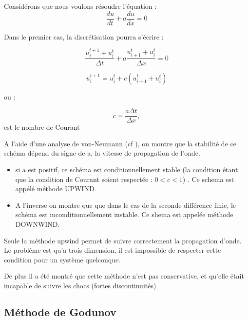 Considérons que nous voulons résoudre l'équation :
\begin{equation}
\frac{du}{dt} + a\frac{du}{dx} = 0
\end{equation}

Dans le premier cas, la discrétisation pourra s'écrire : 


\begin{equation}
\frac{u_i^{t+1} + u_i^t }{\Delta t}   +a \frac{u_{i+1}^t  + u_i^t}{\Delta x} = 0
\end{equation}


\begin{equation}
u_i^{t+1}  = u_i^t +  c \left( u_{i+1}^t  + u_i^t \right) 
\end{equation}

ou : 

\begin{equation}
c= \frac{a \Delta t}{\Delta x},
\end{equation}
est le nombre de Courant


A l'aide d'une analyse de von-Neumann (cf \cite{toro1999riemann}), on montre que la stabilité de ce schéma dépend du signe de a, la vitesse de propagation de l'onde.

\begin{itemize}
\item si a est positif, ce schéma est conditionnellement stable (la condition étant que la condition de Courant soient respectée : $0<c<1$) .
Ce schema est appélé méthode UPWIND.

\item A l'inverse on montre que que dans le cas de la seconde différence finie, le schéma est inconditionnellement instable. 
Ce shema est appelée méthode DOWNWIND.
\end{itemize}

Seule la méthode upwind permet de suivre correctement la propagation d'onde.
Le problème est qu'a trois dimension, il est impossible de respecter cette condition pour un système quelconque.


De plus il a été montré que cette méthode n'est pas conservative, et qu'elle était incapable de suivre les chocs (fortes discontinuités)

\subsection{Méthode de Godunov}


